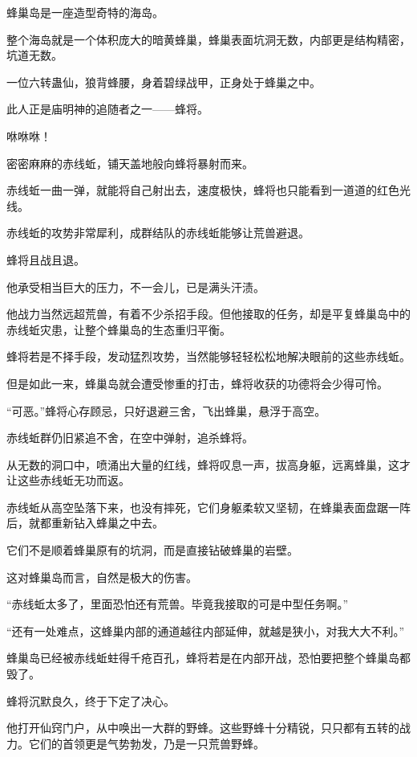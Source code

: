 
\begin{this_body}

蜂巢岛是一座造型奇特的海岛。

整个海岛就是一个体积庞大的暗黄蜂巢，蜂巢表面坑洞无数，内部更是结构精密，坑道无数。

一位六转蛊仙，狼背蜂腰，身着碧绿战甲，正身处于蜂巢之中。

此人正是庙明神的追随者之一——蜂将。

咻咻咻！

密密麻麻的赤线蚯，铺天盖地般向蜂将暴射而来。

赤线蚯一曲一弹，就能将自己射出去，速度极快，蜂将也只能看到一道道的红色光线。

赤线蚯的攻势非常犀利，成群结队的赤线蚯能够让荒兽避退。

蜂将且战且退。

他承受相当巨大的压力，不一会儿，已是满头汗渍。

他战力当然远超荒兽，有着不少杀招手段。但他接取的任务，却是平复蜂巢岛中的赤线蚯灾患，让整个蜂巢岛的生态重归平衡。

蜂将若是不择手段，发动猛烈攻势，当然能够轻轻松松地解决眼前的这些赤线蚯。

但是如此一来，蜂巢岛就会遭受惨重的打击，蜂将收获的功德将会少得可怜。

“可恶。”蜂将心存顾忌，只好退避三舍，飞出蜂巢，悬浮于高空。

赤线蚯群仍旧紧追不舍，在空中弹射，追杀蜂将。

从无数的洞口中，喷涌出大量的红线，蜂将叹息一声，拔高身躯，远离蜂巢，这才让这些赤线蚯无功而返。

赤线蚯从高空坠落下来，也没有摔死，它们身躯柔软又坚韧，在蜂巢表面盘踞一阵后，就都重新钻入蜂巢之中去。

它们不是顺着蜂巢原有的坑洞，而是直接钻破蜂巢的岩壁。

这对蜂巢岛而言，自然是极大的伤害。

“赤线蚯太多了，里面恐怕还有荒兽。毕竟我接取的可是中型任务啊。”

“还有一处难点，这蜂巢内部的通道越往内部延伸，就越是狭小，对我大大不利。”

蜂巢岛已经被赤线蚯蛀得千疮百孔，蜂将若是在内部开战，恐怕要把整个蜂巢岛都毁了。

蜂将沉默良久，终于下定了决心。

他打开仙窍门户，从中唤出一大群的野蜂。这些野蜂十分精锐，只只都有五转的战力。它们的首领更是气势勃发，乃是一只荒兽野蜂。


\end{this_body}
